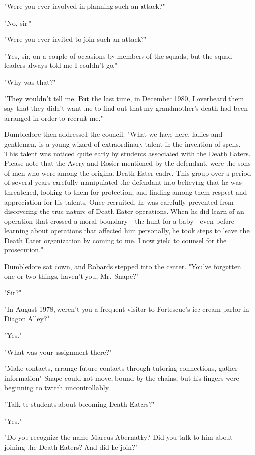 "Were you ever involved in planning such an attack?"

"No, sir."

"Were you ever invited to join such an attack?"

"Yes, sir, on a couple of occasions by members of the squads, but the squad leaders always told me I couldn't go."

"Why was that?"

"They wouldn't tell me. But the last time, in December 1980, I overheard them say that they didn't want me to find out that my grandmother's death had been arranged in order to recruit me."

Dumbledore then addressed the council. "What we have here, ladies and gentlemen, is a young wizard of extraordinary talent in the invention of spells. This talent was noticed quite early by students associated with the Death Eaters. Please note that the Avery and Rosier mentioned by the defendant, were the sons of men who were among the original Death Eater cadre. This group over a period of several years carefully manipulated the defendant into believing that he was threatened, looking to them for protection, and finding among them respect and appreciation for his talents. Once recruited, he was carefully prevented from discovering the true nature of Death Eater operations. When he did learn of an operation that crossed a moral boundary—the hunt for a baby—even before learning about operations that affected him personally, he took steps to leave the Death Eater organization by coming to me. I now yield to counsel for the prosecution."

Dumbledore sat down, and Robards stepped into the center. "You've forgotten one or two things, haven't you, Mr.~Snape?"

"Sir?"

"In August 1978, weren't you a frequent visitor to Fortescue's ice cream parlor in Diagon Alley?"

"Yes."

"What was your assignment there?"

"Make contacts, arrange future contacts through tutoring connections, gather information{\el}" Snape could not move, bound by the chains, but his fingers were beginning to twitch uncontrollably.

"Talk to students about becoming Death Eaters?"

"Yes."

"Do you recognize the name Marcus Abernathy? Did you talk to him about joining the Death Eaters? And did he join?"

